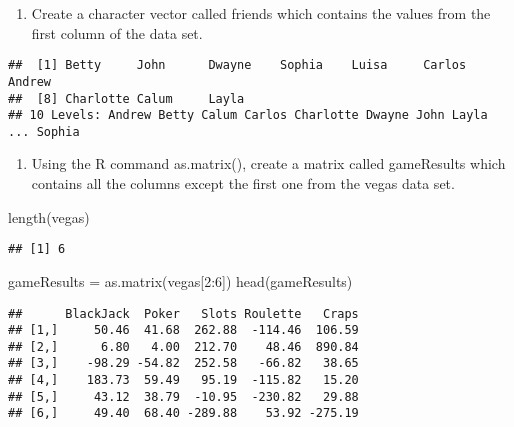 \documentclass[]{article}
\newenvironment{Shaded}{\begin{snugshade}}{\end{snugshade}}
\newcommand{\DecValTok}[1]{\textcolor[rgb]{0.00,0.00,0.81}{#1}}
\newcommand{\FunctionTok}[1]{\textcolor[rgb]{0.00,0.00,0.00}{#1}}
\newcommand{\NormalTok}[1]{#1}
\newcommand{\OtherTok}[1]{\textcolor[rgb]{0.56,0.35,0.01}{#1}}
\newcommand{\SpecialCharTok}[1]{\textcolor[rgb]{0.00,0.00,0.00}{#1}}
\providecommand{\tightlist}{%
  \setlength{\itemsep}{0pt}\setlength{\parskip}{0pt}}
\begin{document}
\begin{enumerate}
\def\labelenumi{(\alph{enumi})}
\setcounter{enumi}{1}
\tightlist
\item
  Create a character vector called friends which contains the values
  from the first column of the data set.
\end{enumerate}

\begin{Shaded}
\end{Shaded}

\begin{verbatim}
##  [1] Betty     John      Dwayne    Sophia    Luisa     Carlos    Andrew   
##  [8] Charlotte Calum     Layla    
## 10 Levels: Andrew Betty Calum Carlos Charlotte Dwayne John Layla ... Sophia
\end{verbatim}

\begin{enumerate}
\def\labelenumi{(\alph{enumi})}
\setcounter{enumi}{2}
\tightlist
\item
  Using the R command as.matrix(), create a matrix called gameResults
  which contains all the columns except the first one from the vegas
  data set.
\end{enumerate}

\begin{Shaded}
\begin{Highlighting}[]
\FunctionTok{length}\NormalTok{(vegas)}
\end{Highlighting}
\end{Shaded}

\begin{verbatim}
## [1] 6
\end{verbatim}

\begin{Shaded}
\begin{Highlighting}[]
\NormalTok{gameResults }\OtherTok{=} \FunctionTok{as.matrix}\NormalTok{(vegas[}\DecValTok{2}\SpecialCharTok{:}\DecValTok{6}\NormalTok{])}
\FunctionTok{head}\NormalTok{(gameResults)}
\end{Highlighting}
\end{Shaded}

\begin{verbatim}
##      BlackJack  Poker   Slots Roulette   Craps
## [1,]     50.46  41.68  262.88  -114.46  106.59
## [2,]      6.80   4.00  212.70    48.46  890.84
## [3,]    -98.29 -54.82  252.58   -66.82   38.65
## [4,]    183.73  59.49   95.19  -115.82   15.20
## [5,]     43.12  38.79  -10.95  -230.82   29.88
## [6,]     49.40  68.40 -289.88    53.92 -275.19
\end{verbatim}
\end{document}
